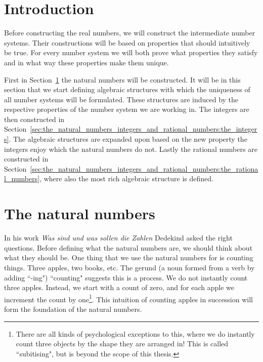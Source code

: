 \documentclass[../main.tex]{subfiles}
\begin{document}
\section*{Introduction}
Before constructing the real numbers, we will construct the intermediate number systems. Their constructions will be based on properties that should intuitively be true. For every number system we will both prove what properties they satisfy and in what way these properties make them unique.

First in Section~\ref{sec:the_natural_numbers_integers_and_rational_numbers:the_natural_numbers} the natural numbers will be constructed. It will be in this section that we start defining algebraic structures with which the uniqueness of all number systems will be formulated. These structures are induced by the respective properties of the number system we are working in. The integers are then constructed in Section~\ref{sec:the_natural_numbers_integers_and_rational_numbers:the_integers}. The algebraic structures are expanded upon based on the new property the integers enjoy which the natural numbers do not. Lastly the rational numbers are constructed in Section~\ref{sec:the_natural_numbers_integers_and_rational_numbers:the_rational_numbers}, where also the most rich algebraic structure is defined.

\section{The natural numbers}\label{sec:the_natural_numbers_integers_and_rational_numbers:the_natural_numbers}
In his work \textit{\textgerman{Was sind und was sollen die Zahlen}} \cite{Dedekind1888} Dedekind asked the right questions. Before defining what the natural numbers are, we should think about what they should be. One thing that we use the natural numbers for is counting things. Three apples, two books, etc. The gerund (a noun formed from a verb by adding ``-ing") ``counting" suggests this is a process. We do not instantly count three apples. Instead, we start with a count of zero, and for each apple we increment the count by one\footnote{There are all kinds of psychological exceptions to this, where we do instantly count three objects by the shape they are arranged in! This is called ``subitising", but is beyond the scope of this thesis.}. This intuition of counting apples in succession will form the foundation of the natural numbers.
\end{document}
